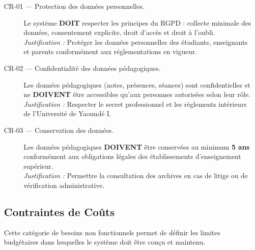 \begin{description}

    \item[CR-01 — Protection des données personnelles.]
    Le système \textbf{DOIT} respecter les principes du RGPD : collecte
    minimale des données, consentement explicite, droit d'accès et
    droit à l'oubli.\\
    \textit{Justification :} Protéger les données personnelles des
    étudiants, enseignants et parents conformément aux réglementations
    en vigueur.

    \item[CR-02 — Confidentialité des données pédagogiques.]
    Les données pédagogiques (notes, présences, séances) sont
    confidentielles et ne \textbf{DOIVENT} être accessibles qu'aux
    personnes autorisées selon leur rôle.\\
    \textit{Justification :} Respecter le secret professionnel et les
    règlements intérieurs de l'Université de Yaoundé I.

    \item[CR-03 — Conservation des données.]
    Les données pédagogiques \textbf{DOIVENT} être conservées au minimum
    \textbf{5 ans} conformément aux obligations légales des établissements
    d'enseignement supérieur.\\
    \textit{Justification :} Permettre la consultation des archives en
    cas de litige ou de vérification administrative.

\end{description}



\subsection{Contraintes de Coûts}

 Cette catégorie de besoins non fonctionnels permet de définir  les limites budgétaires dans
lesquelles le système doit être conçu et maintenu.

